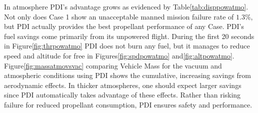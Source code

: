 In atmosphere PDI's advantage grows as evidenced by Table\:\ref{tab:disppowatmo}. Not only does Case 1 show an unacceptable manned mission failure rate of $1.3\%$, but PDI actually provides the best propellant performance of any Case. PDI's fuel savings come primarily from its unpowered flight. During the first 20 seconds in Figure\:\ref{fig:thrpowatmo} PDI does not burn any fuel, but it manages to reduce speed and altitude for free in Figures\:\ref{fig:spdpowatmo} and\:\ref{fig:altpowatmo}. Figure\:\ref{fig:massatmovsvac} comparing Vehicle Mass for the vacuum and atmospheric conditions using PDI shows the cumulative, increasing savings from aerodynamic effects.  In thicker atmospheres, one should expect larger savings since PDI automatically takes advantage of these effects. Rather than risking failure for reduced propellant consumption, PDI ensures safety and performance.



%
%
%
%
%
%
%
%
%
%
%

